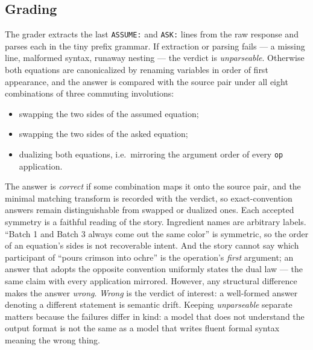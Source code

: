\documentclass{article}
\begin{document}
\subsection{Grading}
\label{sec:grading}
The grader extracts the last \texttt{ASSUME:} and \texttt{ASK:} lines from
the raw response and parses each in the tiny prefix grammar. If extraction
or parsing fails --- a missing line, malformed syntax, runaway nesting ---
the verdict is \textit{unparseable}. Otherwise both equations are
canonicalized by renaming variables in order of first appearance, and the
answer is compared with the source pair under all eight combinations of
three commuting involutions:
\begin{itemize}
    \item swapping the two sides of the assumed equation;
    \item swapping the two sides of the asked equation;
    \item dualizing both equations, i.e.\ mirroring the argument order of
    every \texttt{op} application.
\end{itemize}
The answer is \textit{correct} if some combination maps it onto the source
pair, and the minimal matching transform is recorded with the verdict, so
exact-convention answers remain distinguishable from swapped or dualized
ones.
Each accepted symmetry is a faithful reading of the story.
Ingredient names are arbitrary labels. ``Batch 1 and Batch 3 always come
out the same color'' is symmetric, so the order of an equation's sides is
not recoverable intent. And the story cannot say which participant of
``pours crimson into ochre'' is the operation's \textit{first} argument; an
answer that adopts the opposite convention uniformly states the dual law
--- the same claim with every application mirrored. However, any
structural difference makes the answer \textit{wrong}.
\textit{Wrong} is the verdict of interest: a well-formed answer denoting a
different statement is semantic drift. Keeping \textit{unparseable} separate matters because
the failures differ in kind: a model that does not understand the output format
is not the same as a model that writes fluent formal syntax meaning the
wrong thing.
\end{document}

